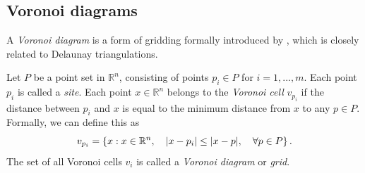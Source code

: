 \subsection{Voronoi diagrams}
A \emph{Voronoi diagram} is a form of gridding formally introduced by \textcite{VoronoiNouvellesAD}, which is closely related to Delaunay triangulations. 

\begin{definition}
Let $P$ be a point set in $\mathbb{R}^n$, consisting of points $p_i \in P$ for $i = 1, ..., m$. Each point $p_i$ is called a \emph{site}. Each point $x \in \mathbb{R}^n$ belongs to the \emph{Voronoi cell} $v_{p_i}$ if the distance between $p_i$ and $x$ is equal to the minimum distance from $x$ to any $p \in P$. Formally, we can define this as
\begin{equation}
    v_{p_i} = \left\{ x : x \in \mathbb{R}^n,\quad \lvert x - p_i\rvert \leq \lvert x - p\rvert,\quad \forall p \in P \right\}.
\end{equation}
The set of all Voronoi cells $v_i$ is called a \emph{Voronoi diagram} or \emph{grid}.
\end{definition}


